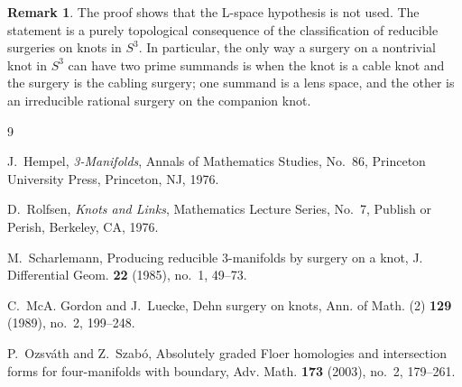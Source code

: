 \documentclass[11pt]{article}
\theoremstyle{plain}
\theoremstyle{definition}
\newtheorem{remark}[theorem]{Remark}
\numberwithin{equation}{section}
\begin{document}
\begin{remark}
The proof shows that the L-space hypothesis is not used.  The statement is a purely topological consequence of the classification of reducible surgeries on knots in $S^3$.  In particular, the only way a surgery on a nontrivial knot in $S^3$ can have two prime summands is when the knot is a cable knot and the surgery is the cabling surgery; one summand is a lens space, and the other is an irreducible rational surgery on the companion knot.
\end{remark}

\begin{thebibliography}{9}

J.~Hempel, \emph{3-Manifolds}, Annals of Mathematics Studies, No.~86, Princeton University Press, Princeton, NJ, 1976.

D.~Rolfsen, \emph{Knots and Links}, Mathematics Lecture Series, No.~7, Publish or Perish, Berkeley, CA, 1976.

M.~Scharlemann, Producing reducible 3-manifolds by surgery on a knot, J. Differential Geom. \textbf{22} (1985), no.~1, 49--73.

C.~McA. Gordon and J.~Luecke, Dehn surgery on knots, Ann. of Math. (2) \textbf{129} (1989), no.~2, 199--248.

P.~Ozsv\'ath and Z.~Szab\'o, Absolutely graded Floer homologies and intersection forms for four-manifolds with boundary, Adv. Math. \textbf{173} (2003), no.~2, 179--261.

\end{thebibliography}
\end{document}
